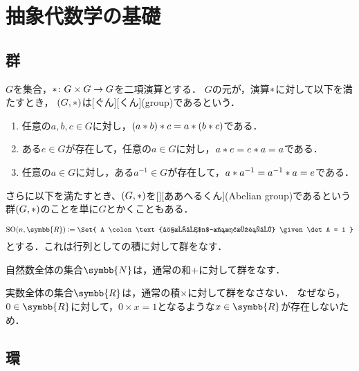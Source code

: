 \documentclass[../sotsu.tex]{subfiles}
\begin{document}
\section{抽象代数学の基礎}

\subsection{群}

\begin{definition}[群]
    \label{dfn:group}
    $G$を集合，$\mathbin{\ast} \colon G \times G \to G$を二項演算とする．
    $G$の元が，演算$\mathbin{\ast}$に対して以下を満たすとき，
    $(G, \mathbin{\ast})$は[ぐん][くん](group)であるという．
    \begin{enumerate}
        \item 任意の$a, b, c \in G$に対し，$(a \mathbin{\ast} b) \mathbin{\ast} c = a \mathbin{\ast} (b \mathbin{\ast} c)$である．
        \item ある$e \in G$が存在して，任意の$a \in G$に対し，$a \mathbin{\ast} e = e \mathbin{\ast} a = a$である．
        \item 任意の$a \in G$に対し，ある$a^{-1} \in G$が存在して，$a \mathbin{\ast} a^{-1} = a^{-1} \mathbin{\ast} a = e$である．
    \end{enumerate}
    さらに以下を満たすとき、$(G, \mathbin{\ast})$を[][ああへるくん](Abelian group)であるという
    群$(G, \mathbin{\ast})$のことを単に$G$とかくこともある．
\end{definition}

\begin{example}
    \begin{equation*}
        \mathrm{SO}(n, \symbb{R}) \coloneq \Set{ A \colon \text{実成分$n$-次正方行列} \given \det A = 1 }
    \end{equation*}
    とする．これは行列としての積に対して群をなす．
\end{example}

\begin{example}
    自然数全体の集合$\symbb{N}$は，通常の和$+$に対して群をなす．
\end{example}

\begin{example}
    実数全体の集合$\symbb{R}$は，通常の積$\times$に対して群をなさない．
    なぜなら，$0 \in \symbb{R}$に対して，$0 \times x = 1$となるような$x \in \symbb{R}$が存在しないため．
\end{example}


\subsection{環}
\end{document}
